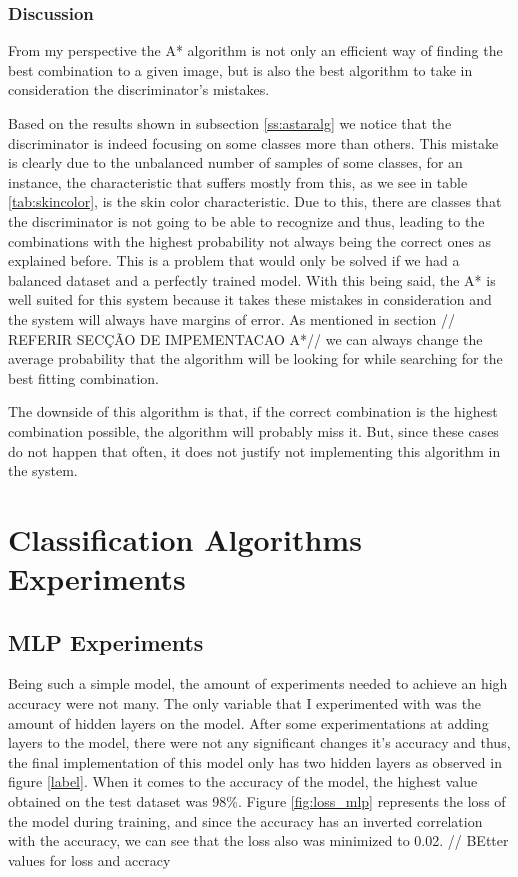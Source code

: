 \documentclass[12pt,a4paper,oneside]{memoir}
\begin{document}
\subsubsection{Discussion}
From my perspective the A* algorithm is not only an efficient way of finding the best combination to a given image, but is also the best algorithm to take in consideration the discriminator's mistakes. 

\par
Based on the results shown in subsection \ref{ss:astaralg} we notice that the discriminator is indeed focusing on some classes more than others. This mistake is clearly due to the unbalanced number of samples of some classes, for an instance, the characteristic that suffers mostly from this, as we see in table \ref{tab:skincolor}, is the skin color characteristic. Due to this, there are classes that the discriminator is not going to be able to recognize and thus, leading to the combinations with the highest probability not always being the correct ones as explained before. This is a problem that would only be solved if we had a balanced dataset and a perfectly trained model. With this being said, the A* is well suited for this system because it takes these mistakes in consideration and the system will always have margins of error. As mentioned in section // REFERIR SECÇÃO DE IMPEMENTACAO A*// we can always change the average probability that the algorithm will be looking for while searching for the best fitting combination. 


\par

The downside of this algorithm is that, if the correct combination is the highest combination possible, the algorithm will probably miss it. But, since these cases do not happen that often, it does not justify not implementing this algorithm in the system.


\section{Classification Algorithms Experiments}
\subsection{\acs{MLP} Experiments}
Being such a simple model, the amount of experiments needed to achieve an high accuracy were not many. The only variable that I experimented with was the amount of hidden layers on the model. After some experimentations at adding layers to the model, there were not any significant changes it's accuracy and thus, the final implementation of this model only has two hidden layers as observed in figure \ref{label}. When it comes to the accuracy of the model, the highest value obtained on the test dataset was 98\%. Figure \ref{fig:loss_mlp} represents the loss of the model during training, and since the accuracy has an inverted correlation with the accuracy, we can see that the loss also was minimized to 0.02. // BEtter values for loss and accracy
\end{document}
